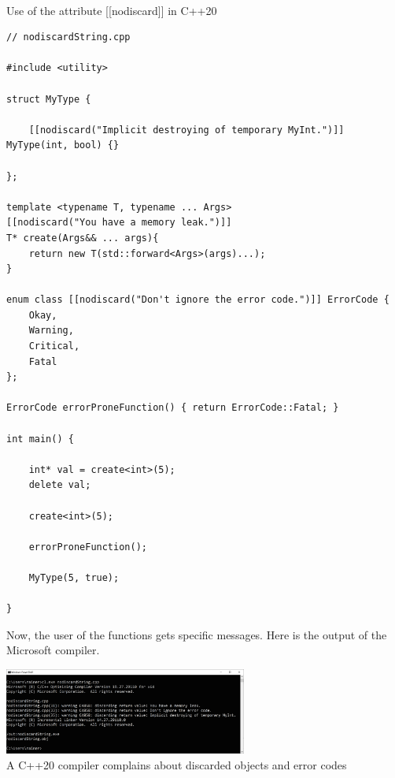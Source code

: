 \hspace*{\fill} \\ %
\noindent
Use of the attribute [[nodiscard]] in C++20
\begin{lstlisting}[style=styleCXX]
// nodiscardString.cpp

#include <utility>

struct MyType {

	[[nodiscard("Implicit destroying of temporary MyInt.")]] MyType(int, bool) {}
	
};

template <typename T, typename ... Args>
[[nodiscard("You have a memory leak.")]]
T* create(Args&& ... args){
	return new T(std::forward<Args>(args)...);
}

enum class [[nodiscard("Don't ignore the error code.")]] ErrorCode {
	Okay,
	Warning,
	Critical,
	Fatal
};
 
ErrorCode errorProneFunction() { return ErrorCode::Fatal; }

int main() {

	int* val = create<int>(5);
	delete val;
	
	create<int>(5);
	
	errorProneFunction();
	
	MyType(5, true);

}
\end{lstlisting}

Now, the user of the functions gets specific messages. Here is the output of the Microsoft compiler.

\begin{center}
\includegraphics[width=0.6\textwidth]{content/3/chapter4/images/46.png}\\
A C++20 compiler complains about discarded objects and error codes
\end{center}


